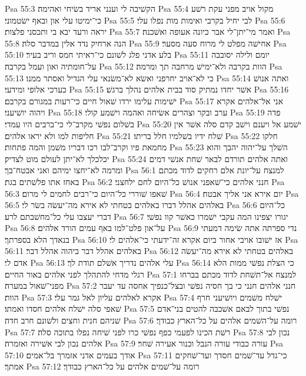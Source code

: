 Psa 55:3  הקשׁיבה לי וענני אריד בשׂיחי ואהימה׃
Psa 55:4  מקול אויב מפני עקת רשׁע כי־ימיטו עלי און ובאף ישׂטמוני׃
Psa 55:5  לבי יחיל בקרבי ואימות מות נפלו עלי׃
Psa 55:6  יראה ורעד יבא בי ותכסני פלצות׃
Psa 55:7  ואמר מי־יתן־לי אבר כיונה אעופה ואשׁכנה׃
Psa 55:8  הנה ארחיק נדד אלין במדבר סלה׃
Psa 55:9  אחישׁה מפלט לי מרוח סעה מסער׃
Psa 55:10  בלע אדני פלג לשׁונם כי־ראיתי חמס וריב בעיר׃
Psa 55:11  יומם ולילה יסובבה על־חומתיה ואון ועמל בקרבה׃
Psa 55:12  הוות בקרבה ולא־ימישׁ מרחבה תך ומרמה׃
Psa 55:13  כי לא־אויב יחרפני ואשׂא לא־משׂנאי עלי הגדיל ואסתר ממנו׃
Psa 55:14  ואתה אנושׁ כערכי אלופי ומידעי׃
Psa 55:15  אשׁר יחדו נמתיק סוד בבית אלהים נהלך ברגשׁ׃
Psa 55:16  ישׁימות עלימו ירדו שׁאול חיים כי־רעות במגורם בקרבם׃
Psa 55:17  אני אל־אלהים אקרא ויהוה יושׁיעני׃
Psa 55:18  ערב ובקר וצהרים אשׂיחה ואהמה וישׁמע קולי׃
Psa 55:19  פדה בשׁלום נפשׁי מקרב־לי כי־ברבים היו עמדי׃
Psa 55:20  ישׁמע אל ויענם וישׁב קדם סלה אשׁר אין חליפות למו ולא יראו אלהים׃
Psa 55:21  שׁלח ידיו בשׁלמיו חלל בריתו׃
Psa 55:22  חלקו מחמאת פיו וקרב־לבו רכו דבריו משׁמן והמה פתחות׃
Psa 55:23  השׁלך על־יהוה יהבך והוא יכלכלך לא־יתן לעולם מוט לצדיק׃
Psa 55:24  ואתה אלהים תורדם לבאר שׁחת אנשׁי דמים ומרמה לא־יחצו ימיהם ואני אבטח־בך׃
Psa 56:1  למנצח על־יונת אלם רחקים לדוד מכתם באחז אתו פלשׁתים בגת׃
Psa 56:2  חנני אלהים כי־שׁאפני אנושׁ כל־היום לחם ילחצני׃
Psa 56:3  שׁאפו שׁוררי כל־היום כי־רבים לחמים לי מרום׃
Psa 56:4  יום אירא אני אליך אבטח׃
Psa 56:5  באלהים אהלל דברו באלהים בטחתי לא אירא מה־יעשׂה בשׂר לי׃
Psa 56:6  כל־היום דברי יעצבו עלי כל־מחשׁבתם לרע׃
Psa 56:7  יגורו יצפינו המה עקבי ישׁמרו כאשׁר קוו נפשׁי׃
Psa 56:8  על־און פלט־למו באף עמים הורד אלהים׃
Psa 56:9  נדי ספרתה אתה שׂימה דמעתי בנאדך הלא בספרתך׃
Psa 56:10  אז ישׁובו אויבי אחור ביום אקרא זה־ידעתי כי־אלהים לי׃
Psa 56:11  באלהים אהלל דבר ביהוה אהלל דבר׃
Psa 56:12  באלהים בטחתי לא אירא מה־יעשׂה אדם לי׃
Psa 56:13  עלי אלהים נדריך אשׁלם תודת לך׃
Psa 56:14  כי הצלת נפשׁי ממות הלא רגלי מדחי להתהלך לפני אלהים באור החיים׃
Psa 57:1  למנצח אל־תשׁחת לדוד מכתם בברחו מפני־שׁאול במערה׃
Psa 57:2  חנני אלהים חנני כי בך חסיה נפשׁי ובצל־כנפיך אחסה עד יעבר הוות׃
Psa 57:3  אקרא לאלהים עליון לאל גמר עלי׃
Psa 57:4  ישׁלח משׁמים ויושׁיעני חרף שׁאפי סלה ישׁלח אלהים חסדו ואמתו׃
Psa 57:5  נפשׁי בתוך לבאם אשׁכבה להטים בני־אדם שׁניהם חנית וחצים ולשׁונם חרב חדה׃
Psa 57:6  רומה על־השׁמים אלהים על כל־הארץ כבודך׃
Psa 57:7  רשׁת הכינו לפעמי כפף נפשׁי כרו לפני שׁיחה נפלו בתוכה סלה׃
Psa 57:8  נכון לבי אלהים נכון לבי אשׁירה ואזמרה׃
Psa 57:9  עורה כבודי עורה הנבל וכנור אעירה שׁחר׃
Psa 57:10  אודך בעמים אדני אזמרך בל־אמים׃
Psa 57:11  כי־גדל עד־שׁמים חסדך ועד־שׁחקים אמתך׃
Psa 57:12  רומה על־שׁמים אלהים על כל־הארץ כבודך׃
